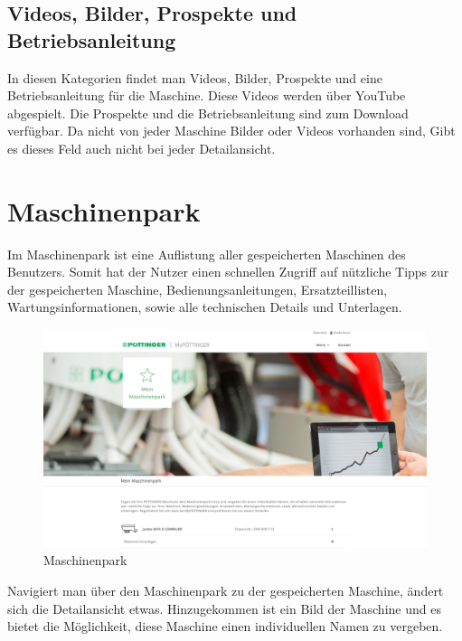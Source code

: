 \subsection{Videos, Bilder, Prospekte und Betriebsanleitung}
In diesen Kategorien findet man Videos, Bilder, Prospekte und eine Betriebsanleitung für die Maschine. Diese Videos werden über YouTube abgespielt. Die Prospekte und die Betriebsanleitung sind zum Download verfügbar. Da nicht von jeder Maschine Bilder oder Videos vorhanden sind, Gibt es dieses Feld auch nicht bei jeder Detailansicht.
\section{Maschinenpark}

Im Maschinenpark ist eine Auflistung aller gespeicherten Maschinen des Benutzers. Somit hat der Nutzer einen schnellen Zugriff auf nützliche Tipps zur der gespeicherten Maschine, Bedienungsanleitungen, Ersatzteillisten, Wartungsinformationen, sowie alle technischen Details und Unterlagen.

\begin{figure}[H]
	\centerline{
		\includegraphics[width=1\textwidth]{./grafiken/erm_maschinenpark.png}
	}
	\vskip0pt
	\caption{Maschinenpark} \label{fig:maschinenpark}
\end{figure}

Navigiert man über den Maschinenpark zu der gespeicherten Maschine, ändert sich die Detailansicht etwas. Hinzugekommen ist ein Bild der Maschine und es bietet die Möglichkeit, diese Maschine einen individuellen Namen zu vergeben.

